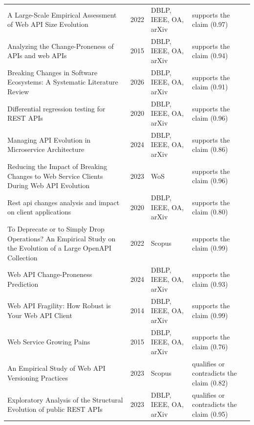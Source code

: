 \begin{longtable}{@{}%
  >{\raggedright\arraybackslash}p{}c%
  >{\raggedright\arraybackslash}p{}%
  >{\raggedright\arraybackslash}p{}@{}}
A Large-Scale Empirical Assessment of Web API Size Evolution & 2022 & DBLP, IEEE, OA, arXiv & supports the claim (0.97) \\
Analyzing the Change-Proneness of APIs and web APIs & 2015 & DBLP, IEEE, OA, arXiv & supports the claim (0.94) \\
Breaking Changes in Software Ecosystems: A Systematic Literature Review & 2026 & DBLP, IEEE, OA, arXiv & supports the claim (0.91) \\
Differential regression testing for REST APIs & 2020 & DBLP, IEEE, OA, arXiv & supports the claim (0.96) \\
Managing API Evolution in Microservice Architecture & 2024 & DBLP, IEEE, OA, arXiv & supports the claim (0.86) \\
Reducing the Impact of Breaking Changes to Web Service Clients During Web API Evolution & 2023 & WoS & supports the claim (0.96) \\
Rest api changes analysis and impact on client applications & 2020 & DBLP, IEEE, OA, arXiv & supports the claim (0.80) \\
To Deprecate or to Simply Drop Operations? An Empirical Study on the Evolution of a Large OpenAPI Collection & 2022 & Scopus & supports the claim (0.99) \\
Web API Change-Proneness Prediction & 2024 & DBLP, IEEE, OA, arXiv & supports the claim (0.93) \\
Web API Fragility: How Robust is Your Web API Client & 2014 & DBLP, IEEE, OA, arXiv & supports the claim (0.99) \\
Web Service Growing Pains & 2015 & DBLP, IEEE, OA, arXiv & supports the claim (0.76) \\
An Empirical Study of Web API Versioning Practices & 2023 & Scopus & qualifies or contradicts the claim (0.82) \\
Exploratory Analysis of the Structural Evolution of public REST APIs & 2023 & DBLP, IEEE, OA, arXiv & qualifies or contradicts the claim (0.95) \\
\end{longtable}
\endgroup
